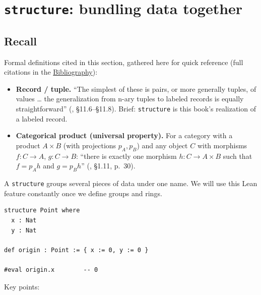 \section{\texorpdfstring{\texttt{structure}: bundling data together}{structure: bundling data together}}\label{sec:02-functions-and-structures:01-structure-basics:1}

\subsection{Recall}\label{sec:02-functions-and-structures:01-structure-basics:2}

Formal definitions cited in this section, gathered here for quick reference (full citations in the \hyperref[sec:root:bibliography:1]{Bibliography}):

\begin{itemize}
\tightlist
\item
  \textbf{Record / tuple.} ``The simplest of these is pairs, or more generally tuples, of values \ldots{} the generalization from n-ary tuples to labeled records is equally straightforward'' (\cite{Pierce2002}, §11.6--§11.8). Brief: \texttt{structure} is this book's realization of a labeled record.
\item
  \textbf{Categorical product (universal property).} For a category with a product \(A \times B\) (with projections \(p_A, p_B\)) and any object \(C\) with morphisms \(f : C \to A\), \(g : C \to B\): ``there is exactly one morphism \(h : C \to A \times B\) such that \(f = p_A h\) and \(g = p_B h\)'' (\cite{Pareigis1970}, §1.11, p.~30).
\end{itemize}

A \texttt{structure} groups several pieces of data under one name. We will use this Lean feature constantly once we define groups and rings.

\begin{lstlisting}
structure Point where
  x : Nat
  y : Nat

def origin : Point := { x := 0, y := 0 }

#eval origin.x        -- 0
\end{lstlisting}

Key points:

